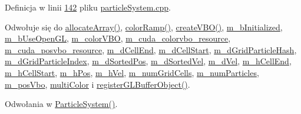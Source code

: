 Definicja w linii \hyperlink{particle_system_8cpp_source_l00142}{142} pliku \hyperlink{particle_system_8cpp_source}{particle\-System.\-cpp}.



Odwołuje się do \hyperlink{particle_system_8cuh_aee51e01a5233e0fda578bd5b3bc38e8f}{allocate\-Array()}, \hyperlink{particle_system_8cpp_source_l00120}{color\-Ramp()}, \hyperlink{particle_system_8cpp_source_l00104}{create\-V\-B\-O()}, \hyperlink{particle_system_8h_source_l00193}{m\-\_\-b\-Initialized}, \hyperlink{particle_system_8h_source_l00193}{m\-\_\-b\-Use\-Open\-G\-L}, \hyperlink{particle_system_8h_source_l00220}{m\-\_\-color\-V\-B\-O}, \hyperlink{particle_system_8h_source_l00226}{m\-\_\-cuda\-\_\-colorvbo\-\_\-resource}, \hyperlink{particle_system_8h_source_l00225}{m\-\_\-cuda\-\_\-posvbo\-\_\-resource}, \hyperlink{particle_system_8h_source_l00215}{m\-\_\-d\-Cell\-End}, \hyperlink{particle_system_8h_source_l00214}{m\-\_\-d\-Cell\-Start}, \hyperlink{particle_system_8h_source_l00212}{m\-\_\-d\-Grid\-Particle\-Hash}, \hyperlink{particle_system_8h_source_l00213}{m\-\_\-d\-Grid\-Particle\-Index}, \hyperlink{particle_system_8h_source_l00208}{m\-\_\-d\-Sorted\-Pos}, \hyperlink{particle_system_8h_source_l00209}{m\-\_\-d\-Sorted\-Vel}, \hyperlink{particle_system_8h_source_l00206}{m\-\_\-d\-Vel}, \hyperlink{particle_system_8h_source_l00202}{m\-\_\-h\-Cell\-End}, \hyperlink{particle_system_8h_source_l00201}{m\-\_\-h\-Cell\-Start}, \hyperlink{particle_system_8h_source_l00197}{m\-\_\-h\-Pos}, \hyperlink{particle_system_8h_source_l00198}{m\-\_\-h\-Vel}, \hyperlink{particle_system_8h_source_l00231}{m\-\_\-num\-Grid\-Cells}, \hyperlink{particle_system_8h_source_l00194}{m\-\_\-num\-Particles}, \hyperlink{particle_system_8h_source_l00219}{m\-\_\-pos\-Vbo}, \hyperlink{particle_system_8cpp_a54f61e4f37db321d451436bf2201b8cb}{multi\-Color} i \hyperlink{particle_system__cuda_8cu_source_l00088}{register\-G\-L\-Buffer\-Object()}.



Odwołania w \hyperlink{particle_system_8cpp_source_l00040}{Particle\-System()}.


